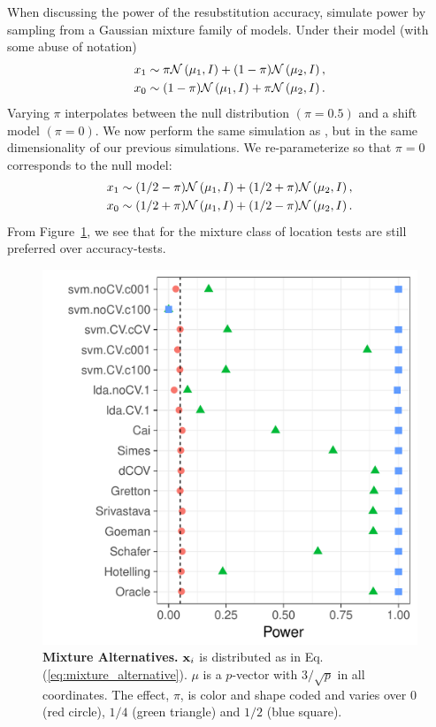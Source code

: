 \documentclass[]{bio}
\begin{document}
When discussing the power of the resubstitution accuracy, \cite{golland_permutation_2005} simulate power by sampling from a Gaussian mixture family of models. 
Under their model (with some abuse of notation)
\begin{align*}
\begin{split}
x_1 & \sim \pi \mathcal{N}\left(\mu_1,I\right)+ (1-\pi) \mathcal{N}\left(\mu_2,I\right), \\
x_0 & \sim (1-\pi) \mathcal{N}\left(\mu_1,I\right)+ \pi \mathcal{N}\left(\mu_2,I\right).
\end{split}
\end{align*}
Varying $\pi$ interpolates between the null distribution $(\pi=0.5)$ and a shift model $(\pi=0)$. 
We now perform the same simulation as \cite{golland_permutation_2005}, but in the same dimensionality of our previous simulations.
We re-parameterize so that $\pi=0$ corresponds to the null model:
\begin{align}
\begin{split}
\label{eq:mixture_alternative}
x_1 & \sim (1/2-\pi) \mathcal{N}\left(\mu_1,I\right)+ (1/2+\pi) \mathcal{N}\left(\mu_2,I\right), \\
x_0 & \sim (1/2+\pi) \mathcal{N}\left(\mu_1,I\right)+ (1/2-\pi) \mathcal{N}\left(\mu_2,I\right).	
\end{split}
\end{align}
From Figure~\ref{fig:file12}, we see that for the mixture class of \cite{golland_permutation_2005} location tests are still preferred over accuracy-tests. 


\begin{figure}[h]
	\centering
	\includegraphics[width=0.5\columnwidth]{"art/file12"}
	\caption{\textbf{Mixture Alternatives.} $\mathbf{x}_i$ is distributed as in Eq.(\ref{eq:mixture_alternative}). 
		$\mu$ is a $p$-vector with $3/\sqrt{p}$ in all coordinates.
		The effect, $\pi$, is color and shape coded and varies over $0$ (red circle), $1/4$ (green triangle) and $1/2$ (blue square). }
	\label{fig:file12}
\end{figure}
\end{document}
